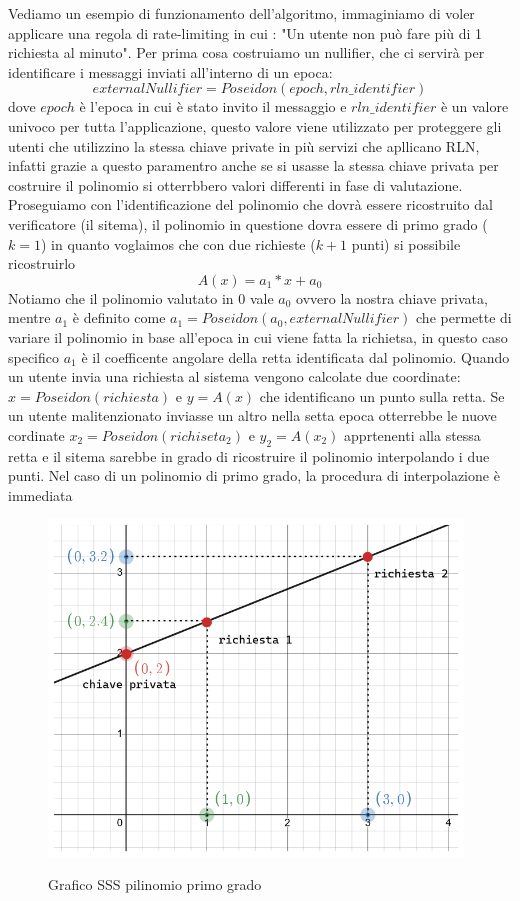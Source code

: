Vediamo un esempio di funzionamento dell'algoritmo, immaginiamo di voler applicare una regola di rate-limiting in cui :
"Un utente non può fare più di 1 richiesta al minuto". Per prima cosa costruiamo un nullifier, che ci servirà per
identificare i messaggi inviati all'interno di un epoca:
$$externalNullifier = Poseidon(epoch,rln\_identifier)$$ dove $epoch$ è l'epoca in cui è stato invito il messaggio e
$rln\_identifier$ è un valore univoco per tutta l'applicazione, questo valore viene utilizzato per proteggere gli utenti
che utilizzino la stessa chiave private in più servizi che apllicano RLN, infatti grazie a questo paramentro anche se si
usasse la stessa chiave privata per costruire il polinomio si otterrbbero valori differenti in fase di valutazione.
Proseguiamo con l'identificazione del polinomio che dovrà essere ricostruito dal verificatore (il sitema), il polinomio
in questione dovra essere di primo grado ($k=1$) in quanto voglaimos che con due richieste ($k+1$ punti) si possibile
ricostruirlo
$$ A(x) = a_1 * x + a_0$$ Notiamo che il polinomio valutato in 0 vale $a_0$ ovvero la nostra chiave privata, mentre
$a_1$ è definito come $a_1 = Poseidon(a_0, externalNullifier)$ che permette di variare il polinomio in base all'epoca in
cui viene fatta la richietsa, in questo caso specifico $a_1$ è il coefficente angolare della retta identificata dal
polinomio. Quando un utente invia una richiesta al sistema vengono calcolate due coordinate: $x = Poseidon(richiesta)$ e
$y=A(x)$ che identificano un punto sulla retta. Se un utente malitenzionato inviasse un altro nella setta epoca
otterrebbe le nuove cordinate $x_2 = Poseidon(richiseta_2)$ e $y_2=A(x_2)$ apprtenenti alla stessa retta e il sitema
sarebbe in grado di ricostruire il polinomio interpolando i due punti. Nel caso di un polinomio di primo grado, la
procedura di interpolazione è immediata
\begin{figure}[H]
    \centering
    \includegraphics[width=11cm]{./chapters/2.rln-protocol/images/6.a_0_interpolation.png}
    \label{fig:a_0_interpolation}
    \captionsetup{justification=centering}
    \caption{Grafico SSS pilinomio primo grado}
\end{figure}